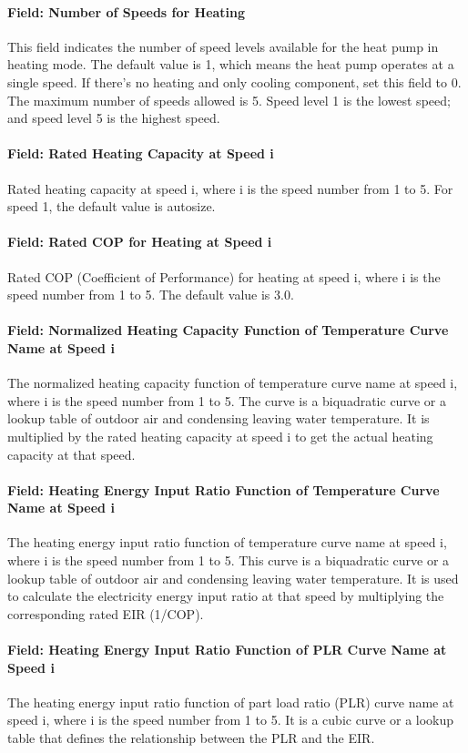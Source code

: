 \paragraph{Field: Number of Speeds for Heating} This field indicates the number
of speed levels available for the heat pump in heating mode. The default value
is 1, which means the heat pump operates at a single speed. If there's no
heating and only cooling component, set this field to 0. The maximum number of
speeds allowed is 5. Speed level 1 is the lowest speed; and speed level 5 is
the highest speed.
\paragraph{Field: Rated Heating Capacity at Speed i} Rated heating capacity at
speed i, where i is the speed number from 1 to 5. For speed 1, the default value
is autosize.
\paragraph{Field: Rated COP for Heating at Speed i} Rated COP (Coefficient of
Performance) for heating at speed i, where i is the speed number from 1 to 5.
The default value is 3.0.
\paragraph{Field: Normalized Heating Capacity Function of Temperature Curve Name
at Speed i} The normalized heating capacity function of temperature curve name
at speed i, where i is the speed number from 1 to 5. The curve is a biquadratic
curve or a lookup table of outdoor air and condensing leaving water temperature.
It is multiplied by the rated heating capacity at speed i to get the actual
heating capacity at that speed.
\paragraph{Field: Heating Energy Input Ratio Function of Temperature Curve Name
at Speed i} The heating energy input ratio function of temperature curve name at
speed i, where i is the speed number from 1 to 5. This curve is a biquadratic
curve or a lookup table of outdoor air and condensing leaving water temperature.
It is used to calculate the electricity energy input ratio at that speed by
multiplying the corresponding rated EIR (1/COP).
\paragraph{Field: Heating Energy Input Ratio Function of PLR Curve Name at Speed
i} The heating energy input ratio function of part load ratio (PLR) curve name
at speed i, where i is the speed number from 1 to 5. It is a cubic curve or a
lookup table that defines the relationship between the PLR and the EIR.
